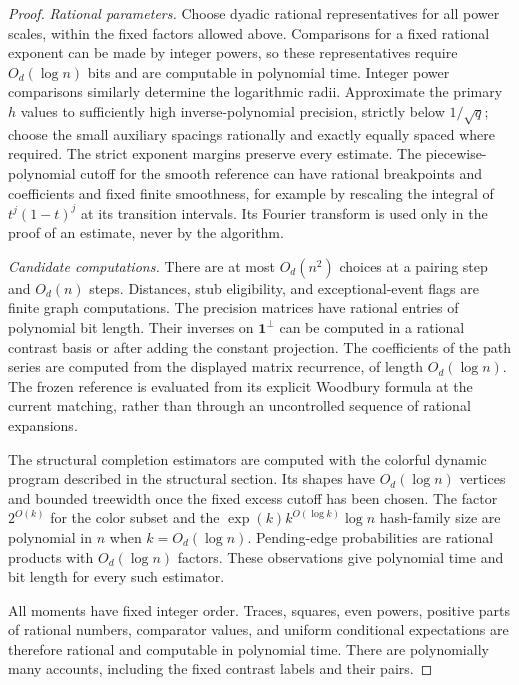 \begin{proof}
\textit{Rational parameters.}
Choose dyadic rational representatives for all power scales, within the
fixed factors allowed above.  Comparisons for a fixed rational exponent
can be made by integer powers, so these representatives require
$O_d(\log n)$ bits and are computable in polynomial time.  Integer power
comparisons similarly determine the logarithmic radii.  Approximate the
primary $h$ values to sufficiently high inverse-polynomial precision,
strictly below $1/\sqrt q$; choose the small auxiliary spacings rationally
and exactly equally spaced where required.  The strict exponent margins
preserve every estimate.  The piecewise-polynomial cutoff for the smooth
reference can have rational breakpoints and coefficients and fixed
finite smoothness, for example by rescaling the integral of
$t^j(1-t)^j$ at its transition intervals.  Its Fourier transform is used
only in the proof of an estimate, never by the algorithm.

\textit{Candidate computations.}
There are at most $O_d(n^2)$ choices at a pairing step and $O_d(n)$ steps.
Distances, stub eligibility, and exceptional-event flags are finite graph
computations.  The precision matrices have rational entries of
polynomial bit length.  Their inverses on $\mathbf1^\perp$ can be
computed in a rational contrast basis or after adding the constant
projection.  The coefficients of the path series are computed from the
displayed matrix recurrence, of length $O_d(\log n)$.  The frozen
reference is evaluated from its explicit Woodbury formula at the current
matching, rather than through an uncontrolled sequence of rational
expansions.

The structural completion estimators are computed with the colorful
dynamic program described in the structural section.  Its shapes have
$O_d(\log n)$ vertices and bounded treewidth once the fixed excess cutoff
has been chosen.  The factor $2^{O(k)}$ for the color subset and the
$\exp(k)k^{O(\log k)}\log n$ hash-family size are polynomial in $n$ when
$k=O_d(\log n)$.  Pending-edge probabilities are rational products with
$O_d(\log n)$ factors.  These observations give polynomial time and bit
length for every such estimator.

All moments have fixed integer order.  Traces, squares, even powers,
positive parts of rational numbers, comparator values, and uniform
conditional expectations are therefore rational and computable in
polynomial time.  There are polynomially many accounts, including the
fixed contrast labels and their pairs.


\end{proof}
